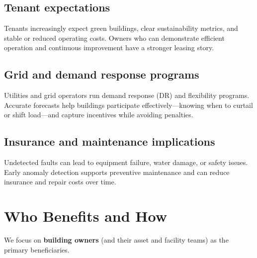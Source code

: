 \documentclass[11pt,a4paper]{article}
\begin{document}
\subsection{Tenant expectations}
Tenants increasingly expect green buildings, clear sustainability metrics, and stable or reduced operating costs. Owners who can demonstrate efficient operation and continuous improvement have a stronger leasing story.

\subsection{Grid and demand response programs}
Utilities and grid operators run demand response (DR) and flexibility programs. Accurate forecasts help buildings participate effectively---knowing when to curtail or shift load---and capture incentives while avoiding penalties.

\subsection{Insurance and maintenance implications}
Undetected faults can lead to equipment failure, water damage, or safety issues. Early anomaly detection supports preventive maintenance and can reduce insurance and repair costs over time.

\section{Who Benefits and How}

We focus on \textbf{building owners} (and their asset and facility teams) as the primary beneficiaries.
\end{document}
